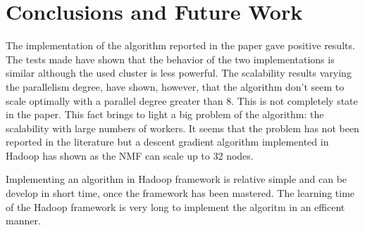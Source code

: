 \section{Conclusions and Future Work}
\label{conclusion}


The implementation of the algorithm reported in the paper gave positive results. The tests made have shown that the behavior of the two implementations is similar although the used cluster is less powerful. The scalability results varying the parallelism degree, have shown, however, that the algorithm don't seem to scale optimally with a parallel degree greater than 8. This is not completely state in the paper. This fact brings to light a big problem of the algorithm: the scalability with large numbers of workers. It seems that the problem has not been reported in the literature but a descent gradient algorithm implemented in Hadoop \cite{IBM_NMF} has shown as the NMF can scale up to 32 nodes.


Implementing an algorithm in Hadoop framework is relative simple and can be develop in short time, once the framework has been mastered. The learning time of the Hadoop framework is very long to implement the algoritm in an efficent manner.